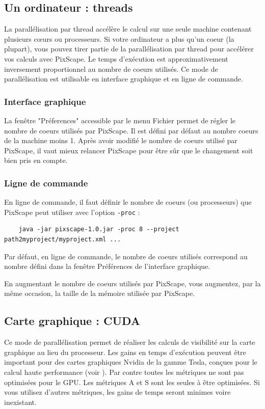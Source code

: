 \documentclass{report}
\begin{document}
\subsection{Un ordinateur : threads}
\label{thread}
La parallélisation par thread accélère le calcul sur une seule machine contenant plusieurs cœurs ou processeurs.
Si votre ordinateur a plus qu'un coeur (la plupart), vous pouvez tirer partie de la parallélisation par thread pour accélérer vos calculs avec PixScape. Le temps d'exécution est approximativement inversement proportionnel au nombre de coeurs utilisés. Ce mode de parallélisation est utilisable en interface graphique et en ligne de commande.

\subsubsection{Interface graphique}
La fenêtre "Préferences" accessible par le menu Fichier permet de régler le nombre de coeurs utilisés par PixScape. Il est défini par défaut au nombre coeurs de la machine moins 1. Après avoir modifié le nombre de coeurs utilisé par PixScape, il vaut mieux relancer PixScape pour être sûr que le changement soit bien pris en compte.

\subsubsection{Ligne de commande}
En ligne de commande, il faut définir le nombre de coeurs (ou processeurs) que PixScape peut utiliser avec l'option \verb|-proc| :
\begin{Verbatim}
	java -jar pixscape-1.0.jar -proc 8 --project path2myproject/myproject.xml ...
\end{Verbatim}
Par défaut, en ligne de commande, le nombre de coeurs utilisés correspond au nombre défini dans la fenêtre Préférences de l'interface graphique.

En augmentant le nombre de coeurs utilisés par PixScape, vous augmentez, par la même occasion, la taille de la mémoire utilisée par PixScape.

\subsection{Carte graphique : CUDA}
\label{cuda}
Ce mode de parallélisation permet de réaliser les calculs de visibilité sur la carte graphique au lieu du processeur. Les gains en temps d'exécution peuvent être important pour des cartes graphiques Nvidia de la gamme Tesla, conçues pour le calcul haute performance (voir ). Par contre toutes les métriques ne sont pas optimisées pour le GPU. Les métriques A et S sont les seules à être optimisées. Si vous utilisez d'autres métriques, les gains de temps seront minimes voire inexistant.
\end{document}
